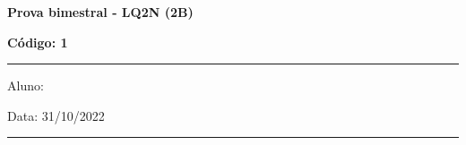 \documentclass[12pt, addpoints]{exam}
\begin{document}
\newpage
        \begin{minipage}[l]{0.75\linewidth}
            \begin{flushleft}
                {\bf \Large Prova bimestral - LQ2N (2B)}
            \end{flushleft}
        \end{minipage}
        \begin{minipage}[r]{0.20\linewidth}
            \begin{flushright}
                {\bf \Large Código: 1}
            \end{flushright}
        \end{minipage}
        \vspace{0.5cm} \hrule \vspace{0.5cm}
        \begin{minipage}{0.75\linewidth}
            Aluno:
        \end{minipage}
        \begin{minipage}{0.20\linewidth}
            Data: 31/10/2022
        \end{minipage}
        \vspace{0.5cm} \hrule \vspace{0.5cm}
\end{document}
